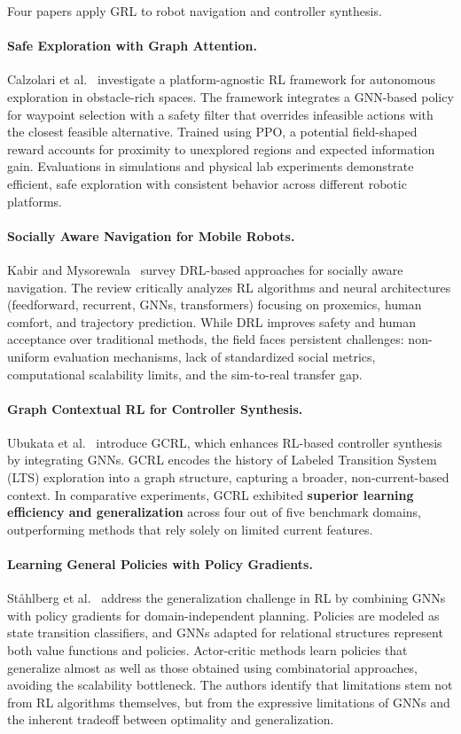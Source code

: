 \documentclass{article}
\begin{document}
Four papers apply GRL to robot navigation and controller synthesis.

\paragraph{Safe Exploration with Graph Attention.}
Calzolari et al.~\cite{safenav2025} investigate a platform-agnostic RL framework for autonomous exploration in obstacle-rich spaces. The framework integrates a GNN-based policy for waypoint selection with a safety filter that overrides infeasible actions with the closest feasible alternative. Trained using PPO, a potential field-shaped reward accounts for proximity to unexplored regions and expected information gain. Evaluations in simulations and physical lab experiments demonstrate efficient, safe exploration with consistent behavior across different robotic platforms.

\paragraph{Socially Aware Navigation for Mobile Robots.}
Kabir and Mysorewala~\cite{socialnav2025} survey DRL-based approaches for socially aware navigation. The review critically analyzes RL algorithms and neural architectures (feedforward, recurrent, GNNs, transformers) focusing on proxemics, human comfort, and trajectory prediction. While DRL improves safety and human acceptance over traditional methods, the field faces persistent challenges: non-uniform evaluation mechanisms, lack of standardized social metrics, computational scalability limits, and the sim-to-real transfer gap.

\paragraph{Graph Contextual RL for Controller Synthesis.}
Ubukata et al.~\cite{gcrl2025} introduce GCRL, which enhances RL-based controller synthesis by integrating GNNs. GCRL encodes the history of Labeled Transition System (LTS) exploration into a graph structure, capturing a broader, non-current-based context. In comparative experiments, GCRL exhibited \textbf{superior learning efficiency and generalization} across four out of five benchmark domains, outperforming methods that rely solely on limited current features.

\paragraph{Learning General Policies with Policy Gradients.}
St\r{a}hlberg et al.~\cite{genpolicy2025} address the generalization challenge in RL by combining GNNs with policy gradients for domain-independent planning. Policies are modeled as state transition classifiers, and GNNs adapted for relational structures represent both value functions and policies. Actor-critic methods learn policies that generalize almost as well as those obtained using combinatorial approaches, avoiding the scalability bottleneck. The authors identify that limitations stem not from RL algorithms themselves, but from the expressive limitations of GNNs and the inherent tradeoff between optimality and generalization.
\end{document}
